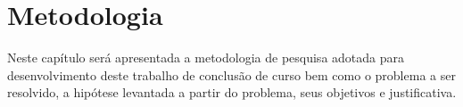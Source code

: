 \chapter{Metodologia}
\label{sec:metodologia}

Neste capítulo será apresentada a metodologia de pesquisa adotada para desenvolvimento 
deste trabalho de conclusão de curso bem como o problema a ser resolvido, a hipótese 
levantada a partir do problema, seus objetivos e justificativa.


